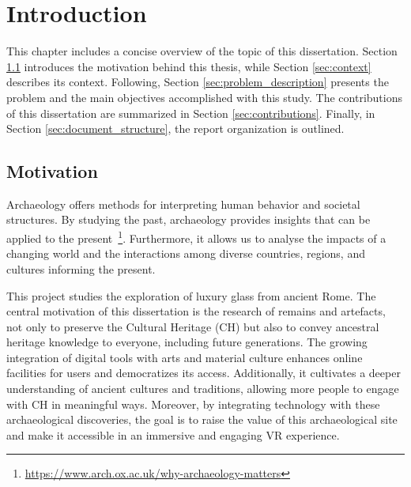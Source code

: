 
%

\chapter{Introduction}
\label{cha:introduction}

This chapter includes a concise overview of the topic of this dissertation. 
Section \ref{sec:motivation} introduces the motivation behind this thesis, while Section \ref{sec:context} describes its context.
Following, Section \ref{sec:problem_description} presents the problem and the main objectives accomplished with this study. 
The contributions of this dissertation are summarized in Section \ref{sec:contributions}.
Finally, in Section \ref{sec:document_structure}, the report organization is outlined.

\section{Motivation}
\label{sec:motivation}
Archaeology offers methods for interpreting human behavior and societal structures. By studying the past, archaeology provides insights that can be applied to the present~\footnote{\url{https://www.arch.ox.ac.uk/why-archaeology-matters}}.
Furthermore, it allows us to analyse the impacts of a changing world and the interactions among diverse countries, regions, and cultures informing the present.

This project studies the exploration of luxury glass from ancient Rome.
The central motivation of this dissertation is the research of remains and artefacts, not
only to preserve the Cultural Heritage (\gls{CH}) but also to convey ancestral heritage knowledge to everyone, including future generations. 
The growing integration of digital tools with arts and material culture enhances online 
facilities for users and democratizes its access. Additionally, it cultivates a deeper understanding of ancient cultures and traditions, allowing more people to engage with
\gls{CH} in meaningful ways. Moreover, by integrating technology with these archaeological 
discoveries, the goal is to raise the value of this archaeological site and make it accessible in an immersive and engaging \gls{VR} experience.


